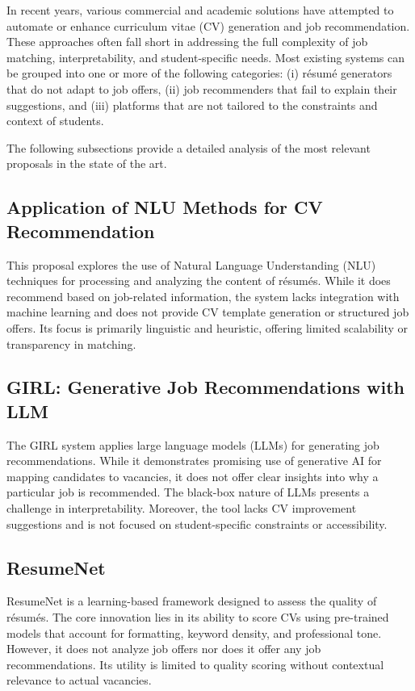 \documentclass[runningheads]{llncs}
\begin{document}
	In recent years, various commercial and academic solutions have attempted to automate or enhance curriculum vitae (CV) generation and job recommendation. These approaches often fall short in addressing the full complexity of job matching, interpretability, and student-specific needs. Most existing systems can be grouped into one or more of the following categories: (i) résumé generators that do not adapt to job offers, (ii) job recommenders that fail to explain their suggestions, and (iii) platforms that are not tailored to the constraints and context of students.
	
	The following subsections provide a detailed analysis of the most relevant proposals in the state of the art.
	
	\subsection{Application of NLU Methods for CV Recommendation~\cite{estadoarte1}}
	This proposal explores the use of Natural Language Understanding (NLU) techniques for processing and analyzing the content of résumés. While it does recommend based on job-related information, the system lacks integration with machine learning and does not provide CV template generation or structured job offers. Its focus is primarily linguistic and heuristic, offering limited scalability or transparency in matching.
	
	\subsection{GIRL: Generative Job Recommendations with LLM~\cite{estadoarte2}}
	The GIRL system applies large language models (LLMs) for generating job recommendations. While it demonstrates promising use of generative AI for mapping candidates to vacancies, it does not offer clear insights into why a particular job is recommended. The black-box nature of LLMs presents a challenge in interpretability. Moreover, the tool lacks CV improvement suggestions and is not focused on student-specific constraints or accessibility.
	
	\subsection{ResumeNet~\cite{estadoarte3}}
	ResumeNet is a learning-based framework designed to assess the quality of résumés. The core innovation lies in its ability to score CVs using pre-trained models that account for formatting, keyword density, and professional tone. However, it does not analyze job offers nor does it offer any job recommendations. Its utility is limited to quality scoring without contextual relevance to actual vacancies.
	
\end{document}
